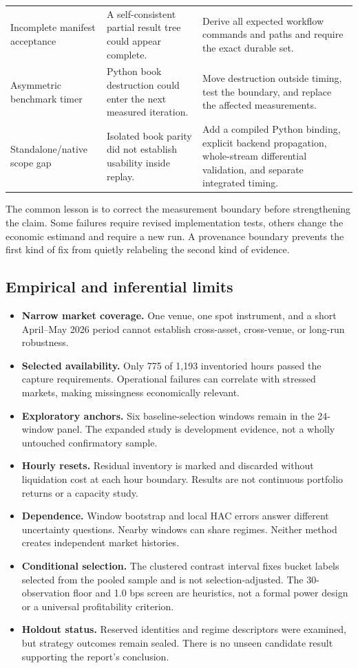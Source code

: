 \begin{longtable}{@{}L{0.22\textwidth}L{0.33\textwidth}L{0.39\textwidth}@{}}
Incomplete manifest acceptance & A self-consistent partial result tree could appear complete. & Derive all expected workflow commands and paths and require the exact durable set. \\
Asymmetric benchmark timer & Python book destruction could enter the next measured iteration. & Move destruction outside timing, test the boundary, and replace the affected measurements. \\
Standalone/native scope gap & Isolated book parity did not establish usability inside replay. & Add a compiled Python binding, explicit backend propagation, whole-stream differential validation, and separate integrated timing. \\
\end{longtable}

The common lesson is to correct the measurement boundary before strengthening
the claim. Some failures require revised implementation tests, others change
the economic estimand and require a new run. A provenance boundary prevents
the first kind of fix from quietly relabeling the second kind of evidence.

\subsection{Empirical and inferential limits}

\begin{itemize}
\item \textbf{Narrow market coverage.} One venue, one spot instrument, and a
short April--May 2026 period cannot establish cross-asset, cross-venue, or
long-run robustness.
\item \textbf{Selected availability.} Only 775 of 1,193 inventoried hours
passed the capture requirements. Operational failures can correlate with
stressed markets, making missingness economically relevant.
\item \textbf{Exploratory anchors.} Six baseline-selection windows remain in
the 24-window panel. The expanded study is development evidence, not a wholly
untouched confirmatory sample.
\item \textbf{Hourly resets.} Residual inventory is marked and discarded
without liquidation cost at each hour boundary. Results are not continuous
portfolio returns or a capacity study.
\item \textbf{Dependence.} Window bootstrap and local HAC errors answer
different uncertainty questions. Nearby windows can share regimes. Neither
method creates independent market histories.
\item \textbf{Conditional selection.} The clustered contrast interval fixes
bucket labels selected from the pooled sample and is not selection-adjusted.
The 30-observation floor and 1.0 bps screen are heuristics, not a formal power
design or a universal profitability criterion.
\item \textbf{Holdout status.} Reserved identities and regime descriptors
were examined, but strategy outcomes remain sealed. There is no unseen
candidate result supporting the report's conclusion.
\end{itemize}

